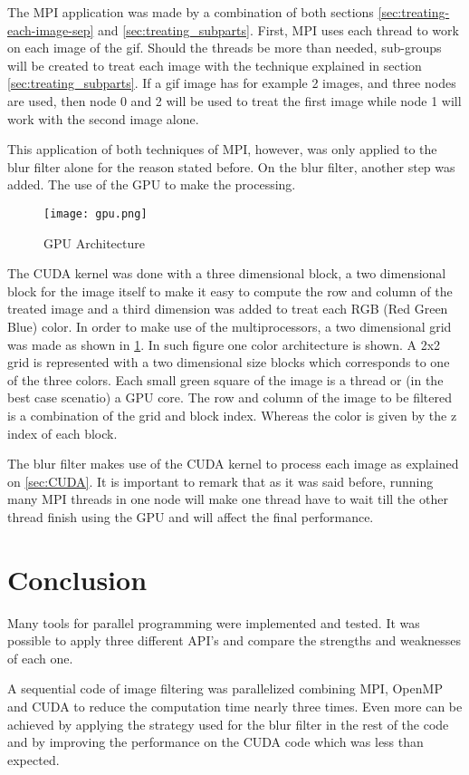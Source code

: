 \documentclass[conference,compsoc]{IEEEtran}
\begin{document}
The MPI application was made by a combination of both sections \ref{sec:treating-each-image-sep} and \ref{sec:treating_subparts}. First, MPI uses each thread to work on each image of the gif. Should the threads be more than needed, sub-groups will be created to treat each image with the technique explained in section  \ref{sec:treating_subparts}. If a gif image has for example 2 images, and three nodes are used, then node 0 and 2 will be used to treat the first image while node 1 will work with the second image alone.

This application of both techniques of MPI, however, was only applied to the blur filter alone for the reason stated before. On the blur filter, another step was added. The use of the GPU to make the processing.

\begin{figure}[H]
	\texttt{[image: gpu.png]}	\centering
	\caption{GPU Architecture \label{fig:GPU-Architecture}}
\end{figure}

The CUDA kernel was done with a three dimensional block, a two dimensional block for the image itself to make it easy to compute the row and column of the treated image and a third dimension was added to treat each RGB (Red Green Blue) color. In order to make use of the multiprocessors, a two dimensional grid was made as shown in \ref{fig:GPU-Architecture}. In such figure one color architecture is shown. A 2x2 grid is represented with a two dimensional size blocks which corresponds to one of the three colors. Each small green square of the image is a thread or (in the best case scenatio) a GPU core. The row and column of the image to be filtered is a combination of the grid and block index. Whereas the color is given by the z index of each block.

The blur filter makes use of the CUDA kernel to process each image as explained on \ref{sec:CUDA}. It is important to remark that as it was said before, running many MPI threads in one node will make one thread have to wait till the other thread finish using the GPU and will affect the final performance.

\section{Conclusion}

Many tools for parallel programming were implemented and tested. It was possible to apply three different API's and compare the strengths and weaknesses of each one.

A sequential code of image filtering was parallelized combining MPI, OpenMP and CUDA to reduce the computation time nearly three times. Even more can be achieved by applying the strategy used for the blur filter in the rest of the code and by improving the performance on the CUDA code which was less than expected.

\newpage
{}


\end{document}
